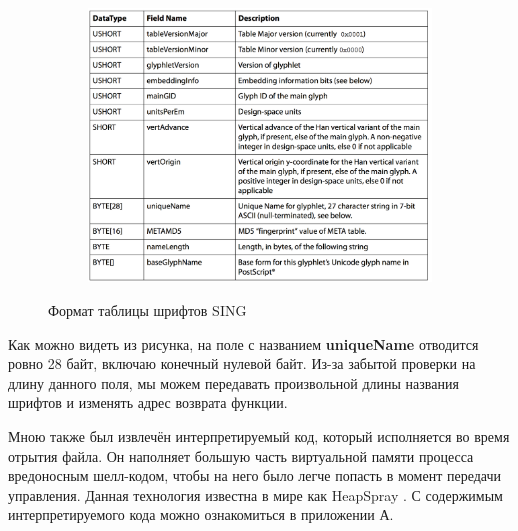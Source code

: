 \begin{figure}[ht]
	\centering
    \begin{subfigure}[b]{1\textwidth}
    \centering
        \includegraphics[scale=0.5]{1.pdf/pasted-image-15.png}
    \end{subfigure}
 
    \caption{Формат таблицы шрифтов SING}
    \label{fig_parsetree}
\end{figure}

Как можно видеть из рисунка, на поле с названием \textbf{uniqueName} отводится ровно 28 байт, включаю конечный нулевой байт.
Из-за забытой проверки на длину данного поля, мы можем передавать произвольной длины названия шрифтов и изменять адрес возврата функции.

Мною также был извлечён интерпретируемый код, который исполняется во время отрытия файла.
Он наполняет большую часть виртуальной памяти процесса вредоносным шелл-кодом, чтобы на него было легче попасть в момент передачи управления.
Данная технология известна в мире как HeapSpray \cite{heap_spray}.
С содержимым интерпретируемого кода можно ознакомиться в приложении А.

